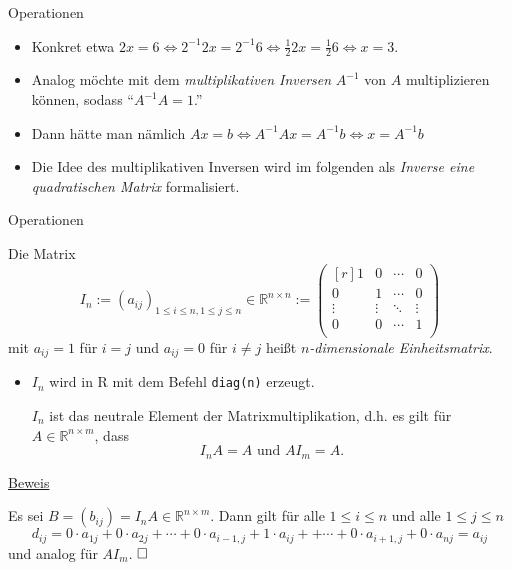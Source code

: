 \documentclass[
  8pt,
  ignorenonframetext,
]{beamer}
\providecommand{\tightlist}{%
  \setlength{\itemsep}{0pt}\setlength{\parskip}{0pt}}
\begin{document}
\begin{frame}{Operationen}
\begin{itemize}
\item
  Konkret etwa
  \(2x = 6 \Leftrightarrow 2^{-1} 2x = 2^{-1}6 \Leftrightarrow \frac{1}{2}2x = \frac{1}{2}6 \Leftrightarrow x = 3\).
\item
  Analog möchte mit dem \emph{multiplikativen Inversen} \(A^{-1}\) von
  \(A\) multiplizieren können, sodass ``\(A^{-1}A = 1\).''
\item
  Dann hätte man nämlich
  \(Ax = b \Leftrightarrow A^{-1}Ax = A^{-1}b \Leftrightarrow x = A^{-1}b\)
\item
  Die Idee des multiplikativen Inversen wird im folgenden als
  \emph{Inverse eine quadratischen Matrix} formalisiert.
\end{itemize}
\end{frame}

\begin{frame}[fragile]{Operationen}
\protect\hypertarget{operationen-22}{}
\footnotesize
{}
\begin{definition}[Einheitsmatrix]
Die Matrix
\begin{equation}
I_n
:= (a_{ij})_{1\le i \le n, 1 \le j \le n}  \in \mathbb{R}^{n \times n}
:=
\begin{pmatrix*}[r]
1      & 0      & \cdots & 0       \\
0      & 1      & \cdots & 0       \\
\vdots & \vdots & \ddots & \vdots  \\
0      & 0      & \cdots & 1       \\
\end{pmatrix*}
\end{equation}
mit $a_{ij} = 1$ für $i = j$  und  $a_{ij} = 0$ für  $i \neq j$ heißt
\textit{$n$-dimensionale Einheitsmatrix}.
\end{definition}

\begin{itemize}
\tightlist
\item
  \(I_n\) wird in R mit dem Befehl \texttt{diag(n)} erzeugt.

  \begin{theorem}
  \justifying
  \normalfont
  $I_n$ ist das neutrale Element der Matrixmultiplikation, d.h. es gilt für $A \in \mathbb{R}^{n \times m}$,
  dass
  \begin{equation}
  I_nA = A \mbox{ und } AI_m = A.
  \end{equation}
  \end{theorem}
\end{itemize}

\underline{Beweis}

Es sei \(B = (b_{ij}) = I_nA \in \mathbb{R}^{n\times m}\). Dann gilt für
alle \(1 \le i \le n\) und alle \(1 \le j \le n\) \begin{equation}
d_{ij}
= 0 \cdot a_{1j}
+ 0 \cdot a_{2j}
+ \cdots
+ 0 \cdot a_{i-1,j}
+ 1 \cdot a_{ij} +
+ \cdots
+ 0 \cdot a_{i+1,j}
+ 0 \cdot a_{nj}
= a_{ij}
\end{equation} und analog für \(AI_m\). \(\hfill \Box\)
\end{frame}
\end{document}
